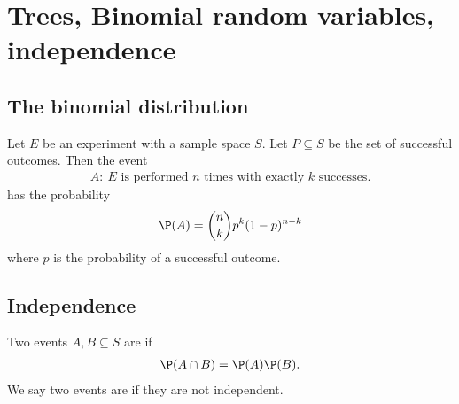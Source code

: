 \documentclass{article}
\begin{document}
\section{Trees, Binomial random variables, independence}
\subsection{The binomial distribution}
\begin{definition}
    Let $E$ be an experiment with a sample space $S$.
    Let $P\subseteq S$ be the set of successful outcomes.
    Then the event
    \begin{align*}
        A:\:\text{$E$ is performed $n$ times with exactly $k$ successes.}
    \end{align*}
    has the probability
    \begin{align*}
        \P(A) = \binom{n}{k}p^k (1-p)^{n-k}
    \end{align*}
    where $p$ is the probability of a successful outcome.
\end{definition}
\subsection{Independence}
\begin{definition}
    Two events $A,B\subseteq S$ are  if
    \begin{align*}
        \P(A\cap B) = \P(A)\P(B).
    \end{align*}
    We say two events are  if they are not independent.
\end{definition}
\end{document}

